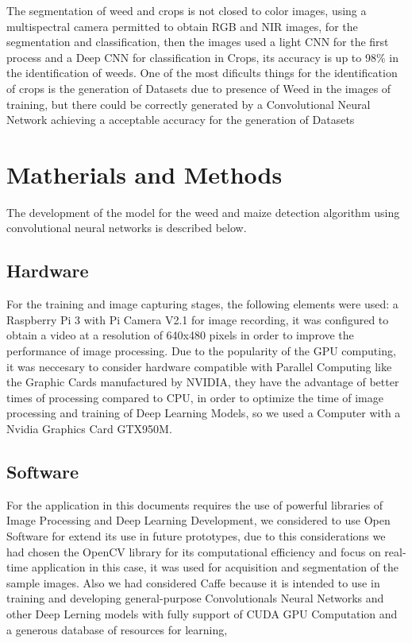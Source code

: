 \documentclass[conference]{IEEEtran}
\begin{document}
The segmentation of weed and crops is not closed to color images, using a multispectral camera  \cite{Potena:Nardi} permitted to obtain RGB and NIR images, for the segmentation and classification, then the images used a light CNN for the first process and a Deep CNN for classification in Crops, its accuracy is up to 98\% in the identification of weeds. One of the most dificults things for the identification of crops is the generation of Datasets due to presence of Weed in the images of training, but there could be correctly generated by a Convolutional Neural Network \cite{Cicco:Potena} achieving a acceptable accuracy for the generation of Datasets 
\\

\section{Matherials and Methods}
The development of the model for the weed and maize detection algorithm using convolutional neural networks is described below.
\\
\subsection{Hardware}
For the training and image capturing stages, the following elements were used: a Raspberry Pi 3 with Pi Camera V2.1 for image recording, it was configured to obtain a video at a resolution of 640x480 pixels in order to improve the performance of image processing. Due to the popularity of the GPU computing, it was neccesary to consider hardware compatible with Parallel Computing like the Graphic Cards manufactured by NVIDIA, they have the advantage of better times of processing compared to CPU, in order to optimize the time of image processing and training of Deep Learning Models, so we used a Computer with a Nvidia Graphics Card GTX950M.
\\

\subsection{Software}

For the application in this documents requires the use of powerful libraries of Image Processing and Deep Learning Development, we considered to use Open Software for extend its use  in future prototypes, due to this considerations we had chosen the OpenCV library for its computational efficiency and focus on real-time application \cite{OpenCV} in this  case, it was used for acquisition and segmentation of the sample images. Also we had considered Caffe because it is intended to use in training and developing general-purpose Convolutionals Neural Networks and other Deep Lerning models \cite{caffe} with fully support of CUDA GPU Computation and a generous database of resources for learning,	
\\
\end{document}
